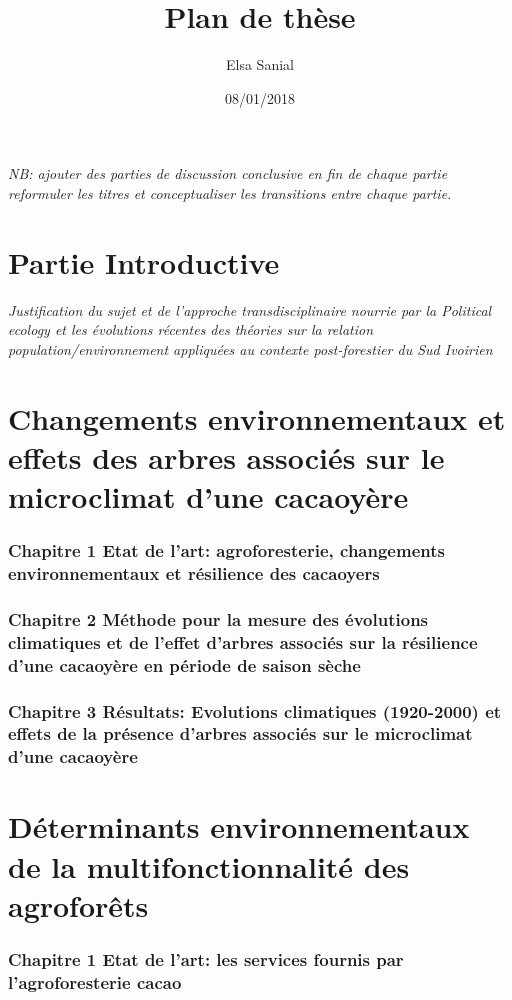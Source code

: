 \documentclass[a4paper,notitlepage]{article}
\title{Plan de thèse}
\author{Elsa Sanial}
\date{08/01/2018}
\begin{document}

\maketitle


\textit{NB: ajouter des parties de discussion conclusive en fin de chaque partie
reformuler les titres
et conceptualiser les transitions entre chaque partie.} 

\part{Partie Introductive}
\vspace{1cm}
\textit{Justification du sujet et de l'approche transdisciplinaire nourrie par la Political ecology et les évolutions récentes des théories sur la relation population/environnement appliquées au contexte post-forestier du Sud Ivoirien}


\part{Changements environnementaux et effets des arbres associés sur le microclimat d'une cacaoyère}
\vspace{1cm}
\section{Chapitre 1 Etat de l'art: agroforesterie, changements environnementaux et résilience des cacaoyers}

\section{Chapitre 2 Méthode pour la mesure des évolutions climatiques et de l'effet d'arbres associés sur la résilience d'une cacaoyère en période de saison sèche}

\section{Chapitre 3 Résultats: Evolutions climatiques (1920-2000) et effets de la présence d'arbres associés sur le microclimat d'une cacaoyère}


\part{Déterminants environnementaux de la multifonctionnalité des agroforêts}
\vspace{1cm}
\section{Chapitre 1 Etat de l'art: les services fournis par l'agroforesterie cacao}
\end{document}

